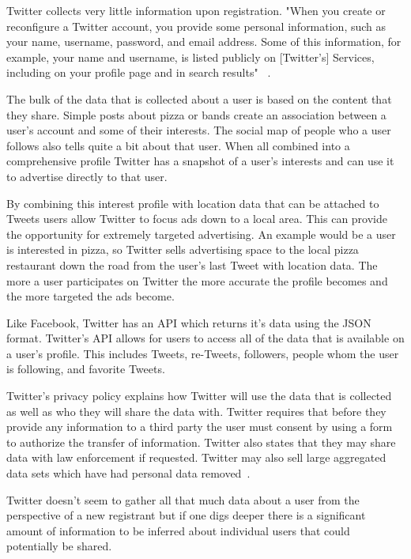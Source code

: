Twitter collects very little information upon registration. "When you create or
reconfigure a Twitter account, you provide some personal information, such as
your name, username, password, and email address. Some of this information, for
example, your name and username, is listed publicly on [Twitter's] Services, including
on your profile page and in search results" ~\cite{twpp}.

The bulk of the data that is collected about a user is based on the content that
they share. Simple posts about pizza or bands create an association between a
user's account and some of their interests. The social map of people who a user
follows also tells quite a bit about that user. When all combined into a
comprehensive profile Twitter has a snapshot of a user's interests and can use
it to advertise directly to that user.

By combining this interest profile with location data that can be attached to
Tweets users allow Twitter to focus ads down to a local area. This can provide
the opportunity for
extremely targeted advertising. An example would be a user is interested in pizza, so
Twitter sells advertising space to the local pizza restaurant down the road from the user's
last Tweet with location data. The more a user participates on Twitter the more
accurate the profile becomes and the more targeted the ads become.

Like Facebook, Twitter has an API which returns it's data using the JSON format.
Twitter's API allows for users to access all of the data that is available on a
user's profile. This includes Tweets, re-Tweets, followers, people whom the user
is following, and favorite Tweets.

Twitter's privacy policy explains how Twitter will use the data that is
collected as well as who they will share the data with. Twitter requires that
before they provide any information to a third party the user must consent by
using a form to authorize the transfer of information. Twitter also states that
they may share data with law enforcement if requested. Twitter may also sell
large aggregated data sets which have had personal data removed~\cite{twpp}.

Twitter doesn't seem to gather all that much data about a user from the
perspective of a new registrant but if one digs deeper there is a significant
amount of information to be inferred about individual users that could potentially
be shared.


